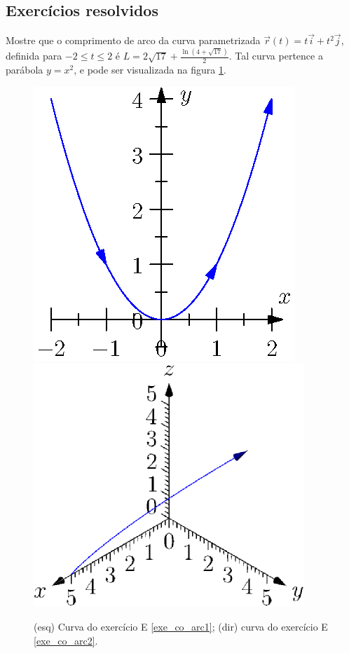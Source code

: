 \subsection*{Exercícios resolvidos}

\begin{exer} \label{exe_co_arc1}
Mostre que o comprimento de arco da curva parametrizada $\vec{r}(t) = t \vec{i} + t^2 \vec{j}$, definida para $-2 \leq t \leq 2$ é $L = 2\sqrt{17} + \frac{\ln(4+\sqrt{17})}{2}$. Tal curva pertence a parábola $y=x^2$, e pode ser visualizada na figura \ref{fig_co_arc1}.
\end{exer}

\begin{figure}
\centering
    \includegraphics{./cap_curvas/figs/comprimento_arco_parabola}
    \includegraphics{./cap_curvas/figs/comprimento_arco_curva}
\caption{(esq) Curva do exercício E \ref{exe_co_arc1}; (dir) curva do exercício E \ref{exe_co_arc2}.}\label{fig_co_arc1}
\end{figure}

